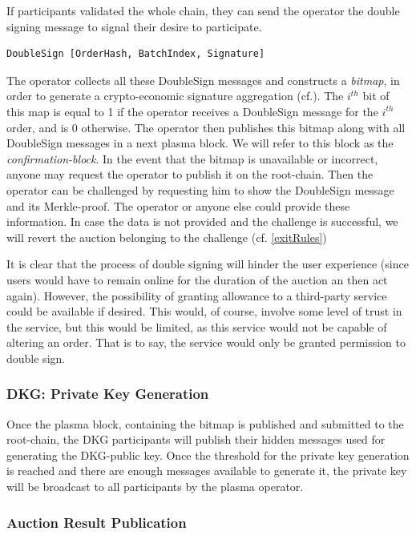 \documentclass[11pt,parskip=full]{scrartcl}%
\begin{document}
If participants validated the whole chain, they can send the operator the double signing message to signal their desire to participate. 
\begin{verbatim}
DoubleSign [OrderHash, BatchIndex, Signature]
\end{verbatim}

The operator collects all these DoubleSign messages and constructs a \emph{bitmap}, in order to generate a crypto-economic signature aggregation (cf.\cite{sig}). 
The $i^{th}$ bit of this map is equal to 1 if the operator receives a DoubleSign message for the $i^{th}$ order, and is 0 otherwise.
The operator then publishes this bitmap along with all DoubleSign messages in a next plasma block. We will refer to this block as the \emph{confirmation-block}.\newline
In the event that the bitmap is unavailable or incorrect, anyone may request the operator to publish it on the root-chain.
Then the operator can be challenged by requesting him to show the DoubleSign message and its Merkle-proof.
The operator or anyone else could provide these information. 
In case the data is not provided and the challenge is successful, we will revert the auction belonging to the challenge (cf. \ref{exitRules})


It is clear that the process of double signing will hinder the user experience (since users would have to remain online for the duration of the auction an then act again). 
However, the possibility of granting allowance to a third-party service could be available if desired.
This would, of course, involve some level of trust in the service, but this would be limited, as this service would not be capable of altering an order. That is to say, the service would only be granted permission to double sign.

\subsubsection{DKG: Private Key Generation}
Once the plasma block, containing the bitmap is published and submitted to the root-chain, the DKG participants will publish their hidden messages used for generating the DKG-public key. 
Once the threshold for the private key generation is reached and there are enough messages available to generate it, the private key will be broadcast to all participants by the plasma operator.

\subsubsection{Auction Result Publication}
\end{document}
